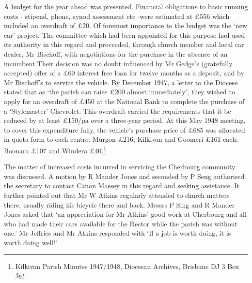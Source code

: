 A budget for the year ahead was presented. Financial obligations to basic running costs - stipend, phone, synod assessment etc -were estimated at £556 which included an overdraft of £20. Of foremost importance to the budget was the `new car' project. The committee which had been appointed for this purpose had used its authority in this regard and proceeded, through church member and local car dealer, Mr Bischoff, with negotiations for the purchase in the absence of an incumbent Their decision was no doubt influenced by Mr Gedge's (gratefully accepted) offer of a £60 interest free loan for twelve months as a deposit, and by Mr Bischoff's to service the vehicle. By December 1947, a letter to the Diocese stated that as `the parish can raise £200 almost immediately', they wished to apply for an overdraft of £450 at the National Bank to complete the purchase of a `Stylemaster' Chevrolet. This overdraft carried the requirements that it be reduced by at least £150/pa over a three-year period. At this May 1948 meeting, to cover this expenditure fully, the vehicle's purchase price of £685 was allocated in quota form to each centre: Murgon £216; Kilkivan and Goomeri £161 each; Boonara £107 and Windera £40.\footnote{Kilkivan Parish Minutes 1947/1948, Diocesan Archives, Brisbane DJ 3 Box 3}

The matter of increased costs incurred in servicing the Cherbourg community was discussed. A motion by R Mander Jones and seconded by P Seng authorised the secretary to contact Canon Massey in this regard and seeking assistance. It further pointed out that Mr W Atkins regularly attended to church matters there, usually riding his bicycle there and back. Messrs P Sing and R Mander Jones asked that `an appreciation for Mr Atkins' good work at Cherbourg and all who had made their cars available for the Rector while the parish was without one.' Mr Jeffries and Mr Atkins responded with `If a job is worth doing, it is worth doing well!'

